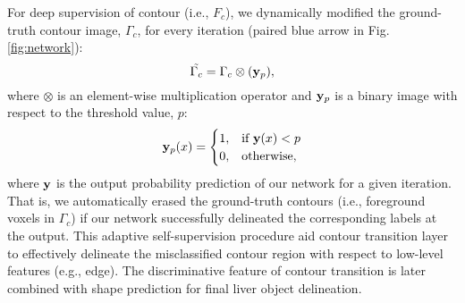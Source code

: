 \documentclass[journal]{IEEEtran}
\begin{document}
For deep supervision of contour (i.e., \(F_c\)), we dynamically modified the ground-truth contour image, \(\Gamma_c\), for every iteration (paired blue arrow in Fig. \ref{fig:network}):
\newline
\begin{equation}
    \Tilde{\Gamma_c}=\Gamma_c \otimes (\bold{y}_p),
\label{eq:closs1}
\end{equation}
\newline
where \(\otimes\) is an element-wise multiplication operator and \(\bold{y}_p\) is a binary image with respect to the threshold value, \(p\):
\newline
\begin{equation}
    \bold{y}_p(x)=
    \begin{cases}
    1, & \text{if}\ \bold{y}(x)<p \\
    0, & \text{otherwise},
    \end{cases}
\label{eq:closs2}
\end{equation}
\newline
where \(\bold{y}\) is the output probability prediction of our network for a given iteration. That is, we automatically erased the ground-truth contours (i.e., foreground voxels in \(\Gamma_c\)) if our network successfully delineated the corresponding labels at the output. This adaptive self-supervision procedure aid contour transition layer to effectively delineate the misclassified contour region with respect to low-level features (e.g., edge). The discriminative feature of contour transition is later combined with shape prediction for final liver object delineation.
\end{document}
